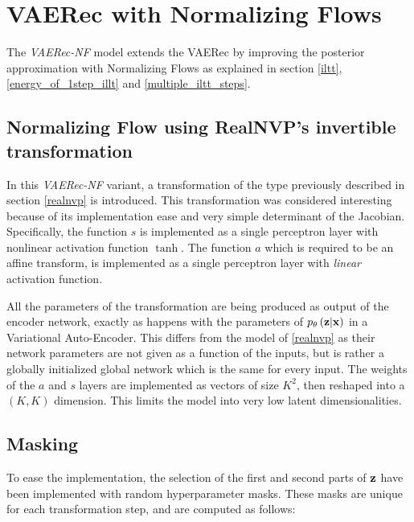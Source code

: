 \section{VAERec with Normalizing Flows}

The \emph{VAERec-NF} model
extends the VAERec by improving the posterior approximation
with Normalizing Flows \cite{1505.05770}
as explained in section \ref{iltt}, 
\ref{energy_of_1step_illt}
and \ref{multiple_iltt_steps}.

\subsection{Normalizing Flow using RealNVP's invertible transformation}

In this \emph{VAERec-NF} variant, a transformation of the type previously described
in section \ref{realnvp} is introduced.
This transformation was considered interesting 
because of its implementation
ease and very simple determinant of the Jacobian.
Specifically, the function $s$ is implemented as
a single perceptron layer with nonlinear activation function 
$\tanh$. The function $a$ which is required to be an affine transform,
is implemented as a single perceptron layer with \emph{linear}
activation function.

All the parameters of the transformation are being produced as output of the
encoder network, exactly as happens with the parameters of $p_\theta\left(\mathbf{z}|\mathbf{x}\right)$ in a Variational
Auto-Encoder. This differs from the model of \ref{realnvp} as their network
parameters are not given as a function of the inputs, but is rather a
globally initialized global network which is the same for every input.
The weights of the $a$ and $s$ layers are implemented as vectors of size $K^2$, then
reshaped into a $(K,K)$ dimension. This limits the model into
very low latent dimensionalities.

\subsection{Masking}

To ease the implementation, the selection of the first and second parts of $\mathbf{z}$
have been implemented with random hyperparameter masks. These masks are unique for each transformation
step, and are computed as follows:


